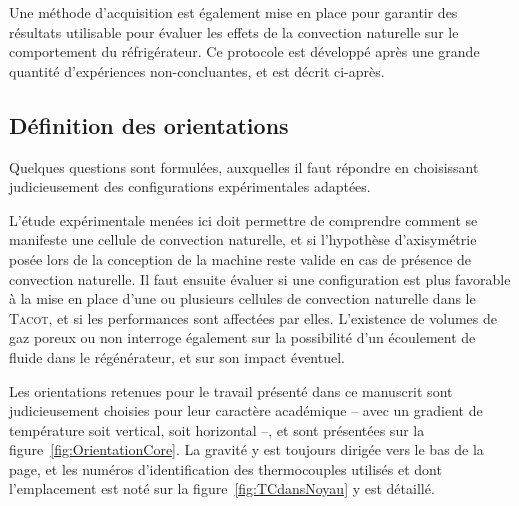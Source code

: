 Une méthode d'acquisition est également mise en place pour garantir des résultats utilisable pour évaluer les effets de la convection naturelle sur le comportement du réfrigérateur. Ce protocole est développé après une grande quantité d'expériences non-concluantes, et est décrit ci-après.

\subsection{Définition des orientations}
Quelques questions sont formulées, auxquelles il faut répondre en choisissant judicieusement des configurations expérimentales adaptées. 

L'étude expérimentale menées ici doit permettre de comprendre comment se manifeste une cellule de convection naturelle, et si l'hypothèse d'axisymétrie posée lors de la conception de la machine reste valide en cas de présence de convection naturelle. Il faut ensuite évaluer si une configuration est plus favorable à la mise en place d'une ou plusieurs cellules de convection naturelle dans le \textsc{Tacot}, et si les performances sont affectées par elles. L'existence de volumes de gaz poreux ou non interroge également sur la possibilité d'un écoulement de fluide dans le régénérateur, et sur son impact éventuel.\medskip 

Les orientations retenues pour le travail présenté dans ce manuscrit sont judicieusement choisies pour leur caractère académique -- avec un gradient de température soit vertical, soit horizontal --, et sont présentées sur la figure~\ref{fig:OrientationCore}. La gravité y est toujours dirigée vers le bas de la page, et les numéros d'identification des thermocouples utilisés et dont l'emplacement est noté sur la figure~\ref{fig:TCdansNoyau} y est détaillé.\medskip

